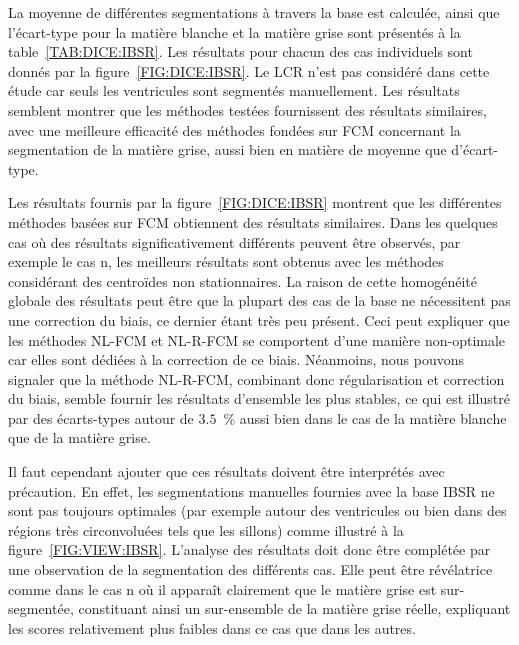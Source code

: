 La moyenne de différentes segmentations à travers la base est calculée, ainsi que l'écart-type pour la matière blanche et la matière grise sont présentés à la table~\ref{TAB:DICE:IBSR}.
Les résultats pour chacun des cas individuels sont donnés par la figure~\ref{FIG:DICE:IBSR}.
Le LCR n'est pas considéré dans cette étude car seuls les ventricules sont segmentés manuellement.
Les résultats semblent montrer que les méthodes testées fournissent des résultats similaires, avec une meilleure efficacité des méthodes fondées sur FCM concernant la segmentation de la matière grise, aussi bien en matière de moyenne que d'écart-type.

Les résultats fournis par la figure~\ref{FIG:DICE:IBSR} montrent que les différentes méthodes basées sur FCM obtiennent des résultats similaires.
Dans les quelques cas où des résultats significativement différents peuvent être observés, par exemple le cas n, les meilleurs résultats sont obtenus avec les méthodes considérant des centroïdes non stationnaires.
La raison de cette homogénéité globale des résultats peut être que la plupart des cas de la base ne nécessitent pas une correction du biais, ce dernier étant très peu présent.
Ceci peut expliquer que les méthodes NL-FCM et NL-R-FCM se comportent d'une manière non-optimale car elles sont dédiées à la correction de ce biais.
Néanmoins, nous pouvons signaler que la méthode NL-R-FCM, combinant donc régularisation et correction du biais, semble fournir les résultats d'ensemble les plus stables, ce qui est illustré par des écarts-types autour de $3.5$~\% aussi bien dans le cas de la matière blanche que de la matière grise.

Il faut cependant ajouter que ces résultats doivent être interprétés avec précaution.
En effet, les segmentations manuelles fournies avec la base IBSR ne sont pas toujours optimales (par exemple autour des ventricules ou bien dans des régions très circonvoluées tels que les sillons) comme illustré à la figure~\ref{FIG:VIEW:IBSR}.
L'analyse des résultats doit donc être complétée par une observation de la segmentation des différents cas.
Elle peut être révélatrice comme dans le cas n où il apparaît clairement que le matière grise est sur-segmentée, constituant ainsi un sur-ensemble de la matière grise réelle, expliquant les scores relativement plus faibles dans ce cas que dans les autres.

